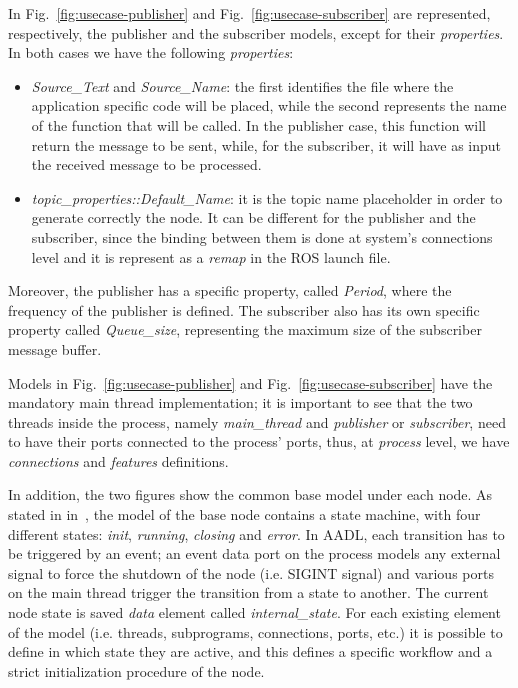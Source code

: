 In Fig.~\ref{fig:usecase-publisher} and Fig.~\ref{fig:usecase-subscriber} are represented, respectively, the publisher and the subscriber models, except for their \textit{properties}. In both cases we have the following \textit{properties}:
\begin{itemize}
\item \textit{Source\_Text} and \textit{Source\_Name}: the first identifies the file where the application specific code will be placed, while the second represents the name of the function that will be called. In the publisher case, this function will return the message to be sent, while, for the subscriber, it will have as input the received message to be processed.
\item \textit{topic\_properties::Default\_Name}: it is the topic name placeholder in order to generate correctly the node. It can be different for the publisher and the subscriber, since the binding between them is done at system’s connections level and it is represent as a \textit{remap} in the ROS launch file.
\end{itemize}

Moreover, the publisher has a specific property, called \textit{Period}, where the frequency of the publisher is defined. The subscriber also has its own specific property called \textit{Queue\_size}, representing the maximum size of the subscriber message buffer.

Models in Fig.~\ref{fig:usecase-publisher} and Fig.~\ref{fig:usecase-subscriber} have the mandatory main thread implementation; it is important to see that the two threads inside the process, namely \textit{main\_thread} and \textit{publisher} or \textit{subscriber}, need to have their ports connected to the process’ ports, thus, at \textit{process} level, we have \textit{connections} and \textit{features} definitions.

In addition, the two figures show the common base model under each node. As stated in in~\cite{Bardaro2017}, the model of the base node contains a state machine, with four different states: \textit{init}, \textit{running}, \textit{closing} and \textit{error}. In AADL, each transition has to be triggered by an event; an event data port on the process models any external signal to force the shutdown of the node (i.e. SIGINT signal) and various ports on the main thread trigger the transition from a state to another. The current node state is saved \textit{data} element called \textit{internal\_state}. For each existing element of the model (i.e. threads, subprograms, connections, ports, etc.) it is possible to define in which state they are active, and this defines a specific workflow and a strict initialization procedure of the node.

